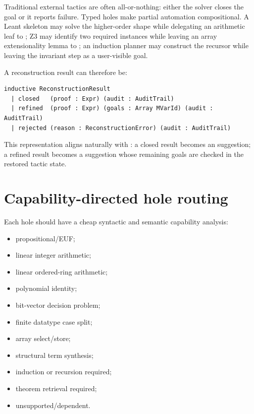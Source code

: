 \documentclass[11pt,letterpaper,openany]{report}
\newcommand{\code}[1]{\texttt{\detokenize{#1}}}
\begin{document}
Traditional external tactics are often all-or-nothing: either the solver closes the
goal or it reports failure. Typed holes make partial automation compositional. A
Leant skeleton may solve the higher-order shape while delegating an arithmetic leaf to
\code{omega}; Z3 may identify two required instances while leaving an array
extensionality lemma to \code{grind}; an induction planner may construct the recursor
while leaving the invariant step as a user-visible goal.

A reconstruction result can therefore be:

\begin{lstlisting}[language=LeanFour,caption={Schematic reconstruction result}]
inductive ReconstructionResult
  | closed   (proof : Expr) (audit : AuditTrail)
  | refined  (proof : Expr) (goals : Array MVarId) (audit : AuditTrail)
  | rejected (reason : ReconstructionError) (audit : AuditTrail)
\end{lstlisting}

This representation aligns naturally with \code{TryThis}: a closed result becomes an
\code{exact} suggestion; a refined result becomes a \code{refine} suggestion whose
remaining goals are checked in the restored tactic state.

\section{Capability-directed hole routing}

Each hole should have a cheap syntactic and semantic capability analysis:

\begin{itemize}
  \item propositional/EUF;
  \item linear integer arithmetic;
  \item linear ordered-ring arithmetic;
  \item polynomial identity;
  \item bit-vector decision problem;
  \item finite datatype case split;
  \item array select/store;
  \item structural term synthesis;
  \item induction or recursion required;
  \item theorem retrieval required;
  \item unsupported/dependent.
\end{itemize}
\end{document}
